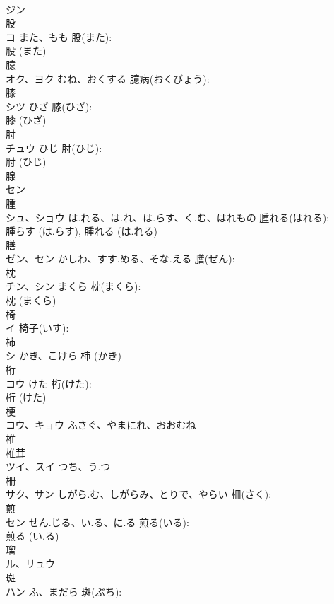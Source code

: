 \documentclass[8pt]{extreport}
\begin{document}
\begin{CJK}{UTF8}{min}
\\	ジン			
\\	股			
\\	コ	また、もも	股(また): 
\\	股 (また)
\\	臆			
\\	オク、ヨク	むね、おくする	臆病(おくびょう): 
\\	膝			
\\	シツ	ひざ	膝(ひざ): 
\\	膝 (ひざ)
\\	肘			
\\	チュウ	ひじ	肘(ひじ): 
\\	肘 (ひじ)
\\	腺			
\\	セン			
\\	腫			
\\	シュ、ショウ	は.れる、は.れ、は.らす、く.む、はれもの	腫れる(はれる): 
\\	腫らす (は.らす), 腫れる (は.れる)
\\	膳			
\\	ゼン、セン	かしわ、すす.める、そな.える	膳(ぜん): 
\\	枕			
\\	チン、シン	まくら	枕(まくら): 
\\	枕 (まくら)
\\	椅			
\\	イ		椅子(いす): 
\\	柿			
\\	シ	かき、こけら		柿 (かき)
\\	桁			
\\	コウ	けた	桁(けた): 
\\	桁 (けた)
\\	梗			
\\	コウ、キョウ	ふさぐ、やまにれ、おおむね		
\\	椎			
\\	椎茸 
\\	ツイ、スイ	つち、う.つ		
\\	柵			
\\	サク、サン	しがら.む、しがらみ、とりで、やらい	柵(さく): 
\\	煎			
\\	セン	せん.じる、い.る、に.る	煎る(いる): 
\\	煎る (い.る)
\\	瑠			
\\	ル、リュウ			
\\	斑			
\\	ハン	ふ、まだら	斑(ぶち): 

\end{CJK}
\end{document}
